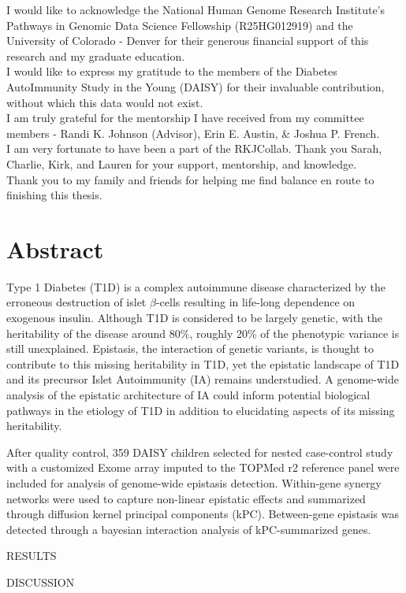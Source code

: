 \documentclass{article}\usepackage[]{graphicx}\usepackage[]{color}
\begin{document}
\noindent
I would like to acknowledge the National Human Genome Research Institute's Pathways in Genomic Data Science Fellowship (R25HG012919) and the University of Colorado - Denver for their generous financial support of this research and my graduate education.\\

\noindent
I would like to express my gratitude to the members of the Diabetes AutoImmunity Study in the Young (DAISY) for their invaluable contribution, without which this data would not exist.\\

\noindent
I am truly grateful for the mentorship I have received from my committee members - Randi K. Johnson (Advisor), Erin E. Austin, \& Joshua P. French.\\

\noindent
I am very fortunate to have been a part of the RKJCollab. Thank you Sarah, Charlie, Kirk, and Lauren for your support, mentorship, and knowledge.\\

\noindent
Thank you to my family and friends for helping me find balance en route to finishing this thesis.\\


\newpage

\section*{Abstract}  %
\par
Type 1 Diabetes (T1D) is a complex autoimmune disease characterized by the erroneous destruction of islet $\beta$-cells resulting in life-long dependence on exogenous insulin. Although T1D is considered to be largely genetic, with the heritability of the disease around 80\%, roughly 20\% of the phenotypic variance is still unexplained. Epistasis, the interaction of genetic variants, is thought to contribute to this missing heritability in T1D, yet the epistatic landscape of T1D and its precursor Islet Autoimmunity (IA) remains understudied. A genome-wide analysis of the epistatic architecture of IA could inform potential biological pathways in the etiology of T1D in addition to elucidating aspects of its missing heritability. 
\par
After quality control, 359 DAISY children selected for nested case-control study with a customized Exome array imputed to the TOPMed r2 reference panel were included for analysis of genome-wide epistasis detection. Within-gene synergy networks were used to capture non-linear epistatic effects and summarized through diffusion kernel principal components (kPC). Between-gene epistasis was detected through a bayesian interaction analysis of kPC-summarized genes.
\par
RESULTS
\par
DISCUSSION
\end{document}
